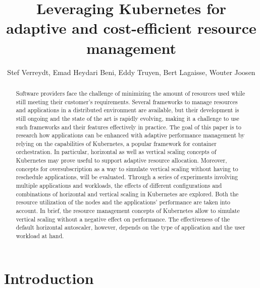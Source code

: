 \documentclass[sigplan,9pt]{acmart}
\begin{document}
\title{Leveraging Kubernetes for adaptive and cost-efficient resource management}

\author{Stef Verreydt, Emad Heydari Beni, Eddy Truyen, Bert Lagaisse, Wouter Joosen}
\renewcommand{\shortauthors}{S. Verreydt et al.}

\begin{abstract}
Software providers face the challenge of minimizing the amount of resources used while still meeting their customer's requirements. Several frameworks to manage resources and applications in a distributed environment are available, but their development is still ongoing and the state of the art is rapidly evolving, making it a challenge to use such frameworks and their features effectively in practice. The goal of this paper is to research how applications can be enhanced with adaptive performance management by relying on the capabilities of Kubernetes, a popular framework for container orchestration. In particular, horizontal as well as vertical scaling concepts of Kubernetes may prove useful to support adaptive resource allocation. Moreover, concepts for oversubscription as a way to simulate vertical scaling without having to reschedule applications, will be evaluated. Through a series of experiments involving multiple applications and workloads, the effects of different configurations and combinations of horizontal and vertical scaling in Kubernetes are explored. Both the resource utilization of the nodes and the applications' performance are taken into account. In brief, the resource management concepts of Kubernetes allow to simulate vertical scaling without a negative effect on performance. The effectiveness of the default horizontal autoscaler, however, depends on the type of application and the user workload at hand.
\end{abstract}

\maketitle


\section{Introduction}
\label{chap:introduction}


%
\end{document}
